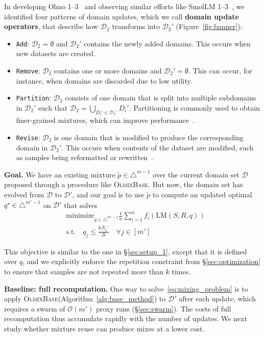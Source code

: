 \documentclass[table]{ai2style/ai2}
\newcommand{\D}[0]{\mathcal{D}}
\newcommand{\LM}[0]{\text{LM}}
\newcommand{\base}[0]{\textsc{OlmixBase}\xspace}
\newcommand{\Add}[0]{\texttt{Add}\xspace}
\newcommand{\Remove}[0]{\texttt{Remove}\xspace}
\newcommand{\Partition}[0]{\texttt{Partition}\xspace}
\newcommand{\Revise}[0]{\texttt{Revise}\xspace}
\begin{document}
In developing Olmo 1--3~\citep{olmo2025olmo3} and observing similar efforts like SmolLM 1--3~\citep{bakouch2025smollm3}, we identified four patterns of domain updates, which we call \textbf{domain update operators}, that describe how $\D_2$
transforms into $\D_2'$ (Figure~\ref{fig:banner}):
\begin{itemize}
    \item \Add: $\D_2 = \emptyset$ and $\D_2'$ contains the newly added domains. This occurs when new datasets are created.
    \item \Remove: $\D_2$ contains one or more domains and $\D_2' = \emptyset$. This can occur, for instance, when domains are discarded due to low utility.
    \item \Partition: $\D_2$ consists of one domain that is split into multiple subdomains in $\D_2'$ such that $\D_2 = \bigcup_{D_i' \in \D_2'} D_i'$. Partitioning is commonly used to obtain finer-grained mixtures, which can improve performance~\citep{wettig2025organizewebconstructingdomains, diao2025climbclusteringbasediterativedata,ge2025rbdomainregroupingdata, peng2025topicsourcekeyeffective}.
    \item \Revise: $\D_2$ is one domain that is modified to produce the corresponding domain in $\D_2'$. This occurs when contents of the dataset are modified, such as samples being reformatted or rewritten~\citep{kimiteam2025kimik2openagentic, maini2024rephrasingwebrecipecompute}.
\end{itemize}

\textbf{Goal.} We have an existing mixture $\tilde{p} \in \triangle^{m-1}$ over the current domain set $\D$ proposed through a procedure like \base. 
But now, the domain set has evolved from $\D$ to $\D'$, and our goal is to use $\tilde{p}$ to compute an updated optimal $q^\star \in \triangle^{m' - 1}$ on $\D'$ that solves
\begin{align}
    &\text{minimize}_{q \in \triangle^{m'-1}}  \frac{1}{n} \sum_{i = 1}^n f_i(\LM(S, R, q))
    \label{eq:mixing_problem} \\
    &\text{s.t.} \quad  q_j \le \frac{k N_j'}{R} \quad \forall j \in [m'] \nonumber
\end{align}

This objective is similar to the one in \S\ref{sec:setup_1}, except that it is defined over $q$, and we explicitly enforce the repetition constraint from \S\ref{sec:optimization} to ensure that samples are not repeated more than $k$ times.

\textbf{Baseline: full recomputation.} One way to solve~\eqref{eq:mixing_problem} is to apply \base (Algorithm~\ref{alg:base_method}) to $\D'$ after each update, which requires a swarm of $\mathcal{O}(m')$ proxy runs (\S\ref{sec:swarm}). The costs of full recomputation thus accumulate rapidly with the number of updates. We next study whether mixture reuse can produce mixes at a lower cost.
\end{document}
